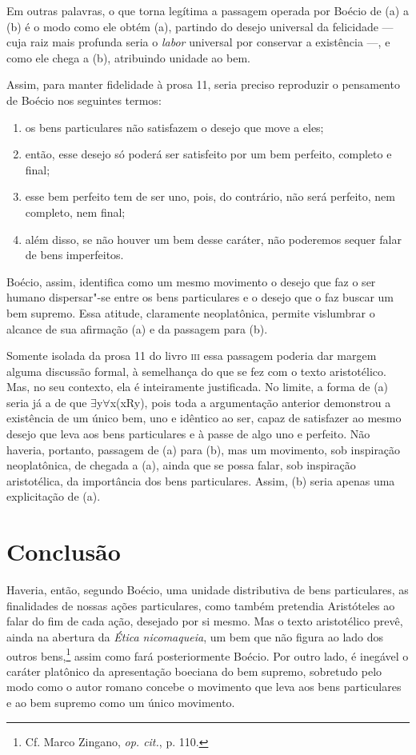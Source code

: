 Em outras palavras, o que torna legítima a passagem operada por
Boécio de (a) a (b) é o modo como ele obtém (a), partindo do
desejo universal da felicidade --- cuja raiz mais profunda seria o
\emph{labor} universal por conservar a existência ---, e como
ele chega a (b), atribuindo unidade ao bem.

Assim, para manter fidelidade à prosa 11, seria preciso
reproduzir o pensamento de Boécio nos seguintes termos:

\begin{enumerate}
\item os bens particulares não satisfazem o desejo que move a
eles;
\item então, esse desejo só poderá ser satisfeito por um bem
perfeito, completo e final;
\item esse bem perfeito tem de ser uno, pois, do contrário, não
será perfeito, nem completo, nem final;
\item além disso, se não houver um bem desse caráter, não
poderemos sequer falar de bens imperfeitos.
\end{enumerate}

Boécio, assim, identifica como um mesmo movimento o desejo que
faz o ser humano dispersar"-se entre os bens particulares e o
desejo que o faz buscar um bem supremo. Essa atitude, claramente
neoplatônica, permite vislumbrar o alcance de sua afirmação (a)
e da passagem para (b).

Somente isolada da prosa 11 do livro \textsc{iii} essa passagem poderia
dar margem alguma discussão formal, à semelhança do que se fez
com o texto aristotélico. Mas, no seu contexto, ela é
inteiramente justificada. No limite, a forma de (a) seria já a
de que ${\exists}$y${\forall}$x(xRy), pois toda a argumentação
anterior demonstrou a existência de um único bem, uno e idêntico
ao ser, capaz de satisfazer ao mesmo desejo que leva aos bens
particulares e à passe de algo uno e perfeito. Não
haveria, portanto, passagem de (a) para (b), mas um movimento,
sob inspiração neoplatônica, de chegada a (a), ainda que se
possa falar, sob inspiração aristotélica, da importância dos
bens particulares. Assim, (b) seria apenas uma explicitação de
(a).

\section{Conclusão}

Haveria, então, segundo Boécio, uma unidade distributiva de bens
particulares, as finalidades de nossas ações particulares, como
também pretendia Aristóteles ao falar do fim de cada ação,
desejado por si mesmo. Mas o texto aristotélico prevê, ainda na
abertura da \emph{Ética nicomaqueia}, um bem que não figura ao
lado dos outros bens,\footnote{ Cf. Marco Zingano, \emph{op.
cit.}, p. 110.} assim como fará posteriormente Boécio. Por
outro lado, é inegável o caráter platônico da apresentação
boeciana do bem supremo, sobretudo pelo modo como o autor romano
concebe o movimento que leva aos bens particulares e ao bem
supremo como um único movimento.

